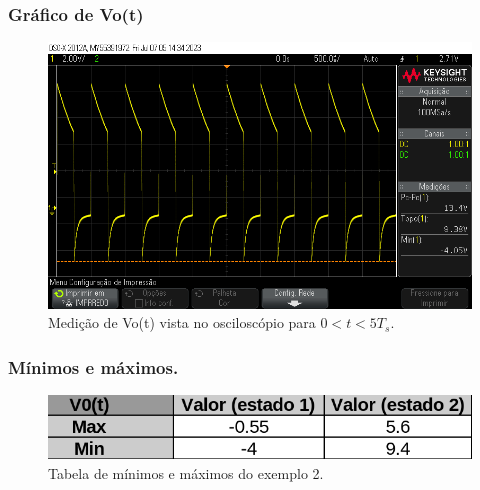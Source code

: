 \subsubsection{Gráfico de Vo(t)}

\begin{figure}[h]
    \label{fig:ex2}
    \centering
    \includegraphics[width=0.7\columnwidth]{images/exemplo2.png}
    \caption{Medição de Vo(t) vista no osciloscópio para $0 < t < 5 T_s$.}
\end{figure}

\subsubsection{Mínimos e máximos.}

\begin{figure}[h]
    \label{fig:minmax_ex2}
    \centering
    \includegraphics[width=0.5\columnwidth]{images/minmax_ex2.png}
    \caption{Tabela de mínimos e máximos do exemplo 2.}
\end{figure}


